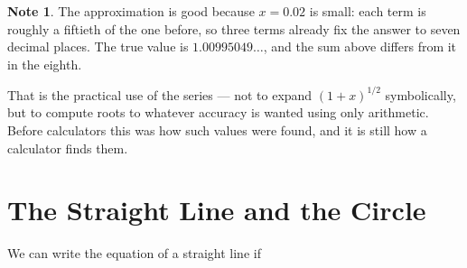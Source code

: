 \documentclass[11pt,a4paper]{article}
\theoremstyle{definition}
\newtheorem{note}[thm]{Note}
\begin{document}
\begin{note}
The approximation is good because $x=0.02$ is small: each term is roughly a
fiftieth of the one before, so three terms already fix the answer to seven decimal
places. The true value is $1.00995049\ldots$, and the sum above differs from it in
the eighth.

That is the practical use of the series --- not to expand $(1+x)^{1/2}$ symbolically,
but to compute roots to whatever accuracy is wanted using only arithmetic. Before
calculators this was how such values were found, and it is still how a calculator
finds them.
\end{note}

\pagebreak
\section{The Straight Line and the Circle}

We can write the equation of a straight line if 
\end{document}
